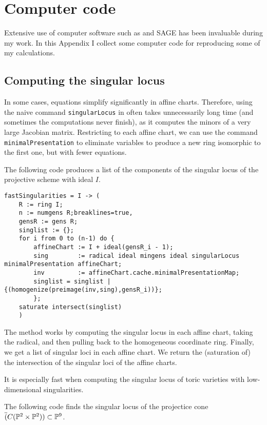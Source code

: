 \chapter{Computer code}
\label{sec:computercode}

Extensive use of computer software such as \MM and SAGE has been invaluable during my work. In this Appendix I collect some computer code for reproducing some of my calculations.

\section{Computing the singular locus}

In some cases, equations simplify significantly in affine charts. Therefore, using the naive command \texttt{singularLocus} in \MM often takes unnecessarily long time (and sometimes the computations never finish), as it computes the minors of a very large Jacobian matrix. Restricting to each affine chart, we can use the command \texttt{minimalPresentation} to eliminate variables to produce a new ring isomorphic to the first one, but with fewer equations.

The following code produces a list of the components of the singular locus of the projective scheme with ideal $I$.

\begin{lstlisting}[language=Macaulay2]
fastSingularities = I -> (
    R := ring I;
    n := numgens R;breaklines=true,
    gensR := gens R;
    singlist := {};
    for i from 0 to (n-1) do {
        affineChart := I + ideal(gensR_i - 1);
        sing        := radical ideal mingens ideal singularLocus minimalPresentation affineChart;
        inv         := affineChart.cache.minimalPresentationMap;
        singlist = singlist | {(homogenize(preimage(inv,sing),gensR_i))};
        };
    saturate intersect(singlist)
    )
\end{lstlisting}

The method works by computing the singular locus in each affine chart, taking the radical, and then pulling back to the homogeneous coordinate ring. Finally, we get a list of singular loci in each affine chart. We return the (saturation of) the intersection of the singular loci of the affine charts.

It is especially fast when computing the singular locus of toric varieties with low-dimensional singularities.

The following code finds the singular locus of the projectice cone $\overline(C(\P^2 \times \P^2)) \subset \P^9$.

